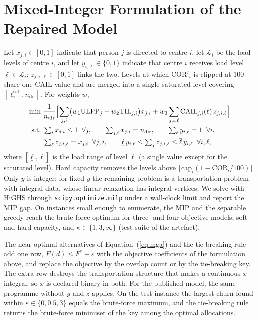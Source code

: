 \documentclass[systems,article,accept,moreauthors,pdftex]{Definitions/mdpi}
\begin{document}
\section{Mixed-Integer Formulation of the Repaired Model}\label{app:mip}
Let $x_{j,i} \in [0,1]$ indicate that person $j$ is directed to centre $i$, let
$\mathcal{L}_i$ be the load levels of centre $i$, and let $y_{i,\ell} \in \{0,1\}$ indicate
that centre $i$ receives load level $\ell \in \mathcal{L}_i$; $z_{j,i,\ell} \in [0,1]$ links
the two. Levels at which $\mathrm{COR}'_i$ is clipped at $100$ share one CAIL value and are
merged into a single saturated level covering $[\ell^{\mathrm{sat}}_i, n_{\mathrm{dir}}]$.
For weights $w$,
\begin{align}
\min\; & \frac{1}{n_{\mathrm{dir}}}\Bigl[\sum_{j,i} \bigl(w_1\mathrm{ULPP}_j + w_2\mathrm{TIL}_{j,i}\bigr)x_{j,i}
 + w_3 \sum_{j,i,\ell} \mathrm{CAIL}_{j,i}(\ell)\, z_{j,i,\ell}\Bigr] \\
\text{s.t.}\; & \textstyle\sum_i x_{j,i} \le 1 \;\; \forall j, \qquad \sum_{j,i} x_{j,i} = n_{\mathrm{dir}},
 \qquad \sum_{\ell} y_{i,\ell} = 1 \;\; \forall i,\\
& \textstyle\sum_{\ell} z_{j,i,\ell} = x_{j,i} \;\; \forall j,i, \qquad
 \underline{\ell}\, y_{i,\ell} \le \sum_j z_{j,i,\ell} \le \overline{\ell}\, y_{i,\ell} \;\; \forall i,\ell,
\end{align}
where $[\underline{\ell}, \overline{\ell}]$ is the load range of level $\ell$ (a single value
except for the saturated level). Hard capacity removes the levels above
$\lfloor \mathrm{cap}_i (1 - \mathrm{COR}_i/100)\rfloor$. Only $y$ is integer: for fixed $y$
the remaining problem is a transportation problem with integral data, whose linear relaxation
has integral vertices. We solve with HiGHS through \texttt{scipy.optimize.milp} under a
wall-clock limit and report the MIP gap. On instances small enough to enumerate, the MIP and
the separable greedy reach the brute-force optimum for three- and four-objective models, soft
and hard capacity, and $\kappa \in \{1, 3, \infty\}$ (test suite of the artefact).

The near-optimal alternatives of Equation~(\ref{eq:mga}) and the tie-breaking rule add one row,
$F(d) \le F^\ast + \varepsilon$ with the objective coefficients of the formulation above, and
replace the objective by the overlap count or by the tie-breaking key. The extra row destroys the
transportation structure that makes a continuous $x$ integral, so $x$ is declared binary in both.
For the published model, the same programme without $y$ and $z$ applies. On the test instance the
largest churn found within $\varepsilon \in \{0, 0.5, 3\}$ equals the brute-force maximum, and the
tie-breaking rule returns the brute-force minimiser of the key among the \linebreak  optimal allocations.
\end{document}
